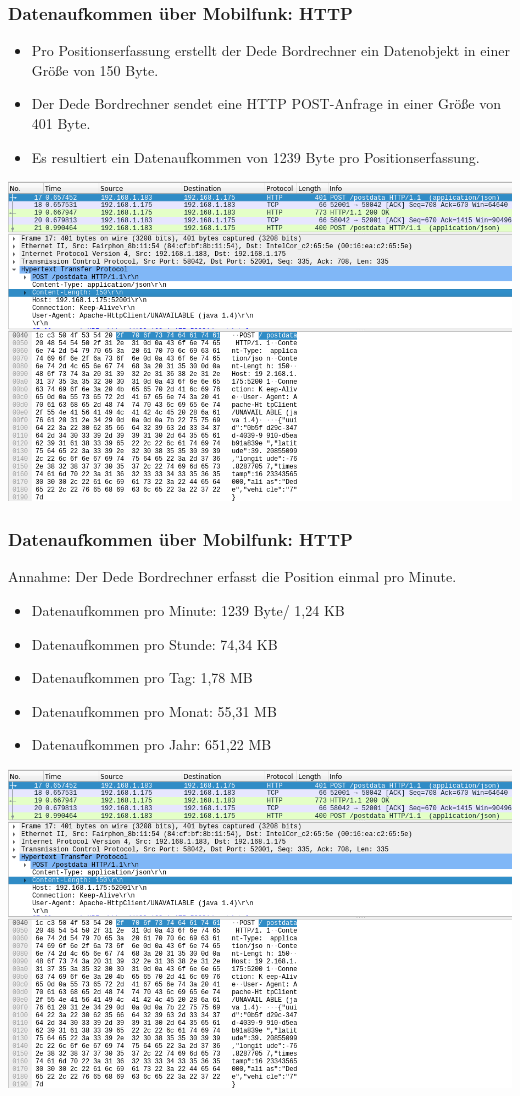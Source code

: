 \begin{frame}
  \frametitle{Datenaufkommen über Mobilfunk: HTTP}
  \begin{itemize}
  \item Pro Positionserfassung erstellt der Dede Bordrechner ein Datenobjekt in einer Größe von 150 Byte.
  \item Der Dede Bordrechner sendet eine HTTP POST-Anfrage in einer Größe von 401 Byte.
  \item Es resultiert ein Datenaufkommen von 1239 Byte pro Positionserfassung.
  \end{itemize}
  \includegraphics[width=0.5\paperwidth]{dede/dede-obc-wireshark-http-post}
\end{frame}

\begin{frame}
  \frametitle{Datenaufkommen über Mobilfunk: HTTP}
  Annahme: Der Dede Bordrechner erfasst die Position einmal pro Minute.
  \begin{itemize}
  \item Datenaufkommen pro Minute: 1239 Byte/ 1,24 KB
  \item Datenaufkommen pro Stunde: 74,34 KB
  \item Datenaufkommen pro Tag: 1,78 MB
  \item Datenaufkommen pro Monat: 55,31 MB
  \item Datenaufkommen pro Jahr: 651,22 MB
  \end{itemize}
  \includegraphics[width=0.5\paperwidth]{dede/dede-obc-wireshark-http-post}
\end{frame}

